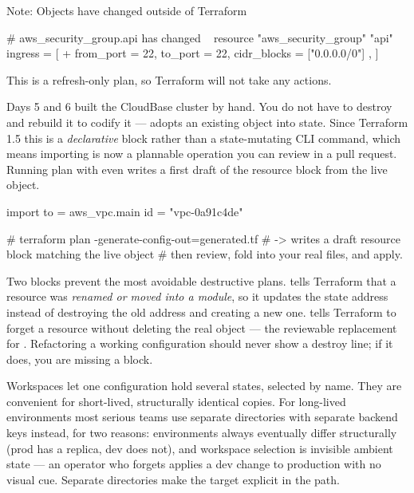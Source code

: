 \begin{outbox}
Note: Objects have changed outside of Terraform

  # aws_security_group.api has changed
  ~ resource "aws_security_group" "api" {
      ~ ingress = [
          + { from_port = 22, to_port = 22, cidr_blocks = ["0.0.0.0/0"] },
        ]
    }

This is a refresh-only plan, so Terraform will not take any actions.
\end{outbox}

 Days 5 and 6 built the CloudBase cluster by hand. You do not have to destroy and rebuild it to codify it ---  adopts an existing object into state. Since Terraform 1.5 this is a \emph{declarative}  block rather than a state-mutating CLI command, which means importing is now a plannable operation you can review in a pull request. Running plan with  even writes a first draft of the resource block from the live object.

\begin{tfbox}
import {
  to = aws_vpc.main
  id = "vpc-0a91c4de"
}

# terraform plan -generate-config-out=generated.tf
#   -> writes a draft resource block matching the live object
# then review, fold into your real files, and apply.
\end{tfbox}

\begin{opsnote}
Two blocks prevent the most avoidable destructive plans.  tells Terraform that a resource was \emph{renamed or moved into a module}, so it updates the state address instead of destroying the old address and creating a new one.  tells Terraform to forget a resource without deleting the real object --- the reviewable replacement for . Refactoring a working configuration should never show a destroy line; if it does, you are missing a  block.
\end{opsnote}

 Workspaces let one configuration hold several states, selected by name. They are convenient for short-lived, structurally identical copies. For long-lived environments most serious teams use separate directories with separate backend keys instead, for two reasons: environments always eventually differ structurally (prod has a replica, dev does not), and workspace selection is invisible ambient state --- an operator who forgets  applies a dev change to production with no visual cue. Separate directories make the target explicit in the path.


